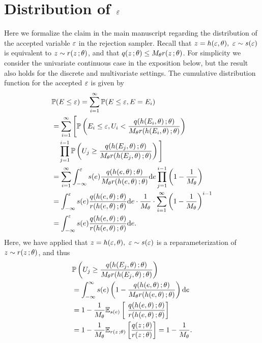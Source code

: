 \section{Distribution of $\varepsilon$}
Here we formalize the claim in the main manuscript regarding the distribution of the accepted variable $\varepsilon$ in the rejection sampler. Recall that ${z=h(\varepsilon,\theta), ~\varepsilon \sim s(\varepsilon)}$ is equivalent to $z\sim r(z\, ;\theta)$, and that $q(z\, ;\theta) \leq M_\theta r(z\, ;\theta)$. For simplicity we consider the univariate continuous case in the exposition below, but the result also holds for the discrete and multivariate settings. The cumulative distribution function for the accepted $\varepsilon$ is given by
\begin{align*}
\begin{split}
&\mathbb{P}(E \leq \varepsilon) = \sum_{i=1}^\infty \mathbb{P}(E \leq \varepsilon, E = E_i)\\
&= \sum_{i=1}^\infty \Bigg[ \mathbb{P}\left(E_i \leq \varepsilon, U_i < \frac{q(h(E_i,\theta)\, ;\theta)}{M_\theta r(h(E_i,\theta)\, ;\theta)}\right)\\
&\quad\prod_{j=1}^{i-1} \mathbb{P}\left(U_j \geq \frac{q(h(E_j,\theta)\, ;\theta)}{M_\theta r(h(E_j,\theta)\, ;\theta)}\right)\Bigg] \\
&= \sum_{i=1}^\infty \int_{-\infty}^{\varepsilon} s(e) \frac{q(h(e,\theta)\, ;\theta)}{M_\theta r(h(e,\theta)\, ;\theta)} \textrm{d} e \prod_{j=1}^{i-1} \left(1-\frac{1}{M_\theta}\right)\\
&= \int_{-\infty}^{\varepsilon} s(e) \frac{q(h(e,\theta)\, ;\theta)}{r(h(e,\theta)\, ;\theta)} \textrm{d} e \cdot \frac{1}{M_\theta} \cdot \sum_{i=1}^\infty  \left(1-\frac{1}{M_\theta}\right)^{i-1}\\
&= \int_{-\infty}^{\varepsilon} s(e) \frac{q(h(e,\theta)\, ;\theta)}{r(h(e,\theta)\, ;\theta)}\textrm{d} e.
\end{split}
\end{align*}
Here, we have applied that ${z=h(\varepsilon,\theta), ~\varepsilon \sim s(\varepsilon)}$ is a reparameterization of $z\sim r(z\, ;\theta)$, and thus
\begin{align*}
\begin{split}
& \Prb\left(U_j \geq \frac{q(h(E_j,\theta)\g\theta)}{M_\theta r(h(E_j,\theta)\g\theta)}\right) \\
& = \int_{-\infty}^{\infty} s(e)\left( 1- \frac{q(h(e,\theta)\g\theta)}{M_\theta r(h(e,\theta)\g\theta)}\right) \myd e \\
& = 1-\frac{1}{M_\theta}\E_{s(e)}\left[ \frac{q(h(e,\theta)\g\theta)}{r(h(e,\theta)\g\theta)}\right] \\
& = 1-\frac{1}{M_\theta}\E_{r(z\g \theta)} \left[ \frac{q(z\g\theta)}{r(z\g\theta)} \right] = 1-\frac{1}{M_\theta}.
\end{split}
\end{align*}

